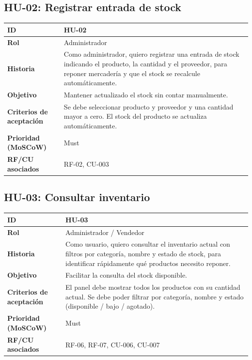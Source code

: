 \documentclass[12pt, a4paper]{article}
\begin{document}
\subsection{HU-02: Registrar entrada de stock}
\begin{center}
\renewcommand{\arraystretch}{1.4}
\begin{tabular}{|L{4cm}|L{12cm}|}
\hline
\textbf{ID} & HU-02 \\
\hline
\textbf{Rol} & Administrador \\
\hline
\textbf{Historia} & Como administrador, quiero registrar una entrada de stock indicando el producto, la cantidad y el proveedor, para reponer mercadería y que el stock se recalcule automáticamente. \\
\hline
\textbf{Objetivo} & Mantener actualizado el stock sin contar manualmente. \\
\hline
\textbf{Criterios de aceptación} & Se debe seleccionar producto y proveedor y una cantidad mayor a cero. El stock del producto se actualiza automáticamente. \\
\hline
\textbf{Prioridad (MoSCoW)} & Must \\
\hline
\textbf{RF/CU asociados} & RF-02, CU-003 \\
\hline
\end{tabular}
\end{center}

\subsection{HU-03: Consultar inventario}
\begin{center}
\renewcommand{\arraystretch}{1.4}
\begin{tabular}{|L{4cm}|L{12cm}|}
\hline
\textbf{ID} & HU-03 \\
\hline
\textbf{Rol} & Administrador / Vendedor \\
\hline
\textbf{Historia} & Como usuario, quiero consultar el inventario actual con filtros por categoría, nombre y estado de stock, para identificar rápidamente qué productos necesito reponer. \\
\hline
\textbf{Objetivo} & Facilitar la consulta del stock disponible. \\
\hline
\textbf{Criterios de aceptación} & El panel debe mostrar todos los productos con su cantidad actual. Se debe poder filtrar por categoría, nombre y estado (disponible / bajo / agotado). \\
\hline
\textbf{Prioridad (MoSCoW)} & Must \\
\hline
\textbf{RF/CU asociados} & RF-06, RF-07, CU-006, CU-007 \\
\hline
\end{tabular}
\end{center}
\end{document}
